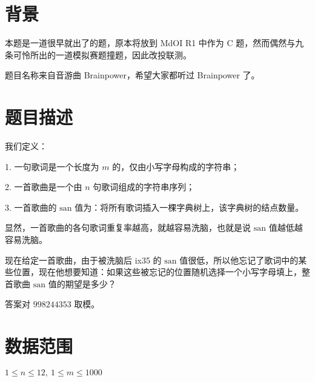 \documentclass[a4paper,10pt]{article}
\begin{document}
\newpage

\section*{背景}

本题是一道很早就出了的题，原本将放到 MdOI R1 中作为 C 题，然而偶然与九条可怜所出的一道模拟赛题撞题，因此改投联测。

题目名称来自音游曲 Brainpower，希望大家都听过 Brainpower 了。

\section*{题目描述}

我们定义：

1. 一句歌词是一个长度为 $m$ 的，仅由小写字母构成的字符串；

2. 一首歌曲是一个由 $n$ 句歌词组成的字符串序列；

3. 一首歌曲的 $\text{san}$ 值为：将所有歌词插入一棵字典树上，该字典树的结点数量。

显然，一首歌曲的各句歌词重复率越高，就越容易洗脑，也就是说 $\text{san}$ 值越低越容易洗脑。

现在给定一首歌曲，由于被洗脑后 ix35 的 $\text{san}$ 值很低，所以他忘记了歌词中的某些位置，现在他想要知道：如果这些被忘记的位置随机选择一个小写字母填上，整首歌曲 $\text{san}$ 值的期望是多少？

答案对 $998244353$ 取模。

\section*{数据范围}

$1\leq n\leq 12,\ 1 \leq m\leq 1000$

\newpage
\end{document}
